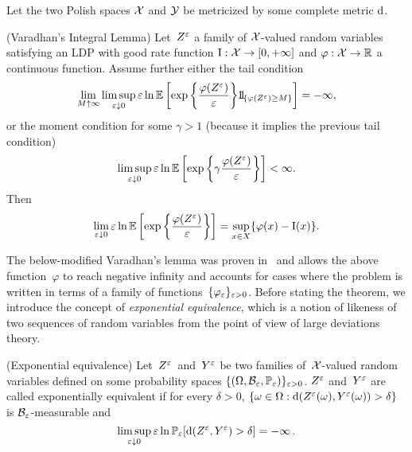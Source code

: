 Let the two Polish spaces $\mathcal{X}$ and $\mathcal{Y}$ be metricized by some complete metric $\mathrm{d}$.
\begin{theorem} (Varadhan's Integral Lemma)\label{thm:varadhan} %
Let~$Z^{\varepsilon}$ a family of $\mathcal{X}$-valued random variables satisfying an LDP with good rate function $\mathrm{I}:\mathcal{X}\to [0,+\infty]$ and $\varphi: \mathcal{X} \to \mathbb{R}$ a continuous function. 
Assume further either the tail condition
$$
\lim\limits_{M\uparrow \infty} \limsup_{\eps \downarrow 0}
\eps\ln \EE\left[\exp\left\{\frac{\varphi(Z^{\eps})}{\eps}\right\}\ind_{ \{ \varphi(Z^{\eps}) \geq M\}}\right]  = - \infty,
$$
or the moment condition for some $\gamma > 1$ (because it implies the previous tail condition)
$$
\limsup\limits_{\varepsilon \downarrow 0}
\varepsilon\ln \mathbb{E}\left[\exp\left\{\gamma \frac{\varphi(Z^{\varepsilon})}{\varepsilon}\right\}\right]
< \infty .
$$
Then
$$
\lim_{\varepsilon \downarrow 0}
\varepsilon\ln \mathbb{E}\left[\exp\left\{\frac{\varphi(Z^{\varepsilon})}{\varepsilon}\right\}\right]
= \sup\limits_{x \in X} \{\varphi(x) - \mathrm{I}(x) \}.
$$
\end{theorem}

The below-modified Varadhan's lemma was proven in~\cite{Robertson2010SampleModels} and allows the above function~$\varphi$ to reach negative infinity and accounts for cases where the problem is written in terms of a family of functions~$\{\varphi_{\varepsilon}\}_{\varepsilon>0}$. Before stating the theorem, we introduce the concept of \emph{exponential equivalence}, which is a notion of likeness of two sequences of random variables from the point of view of large deviations theory.
\begin{definition} (Exponential equivalence)\label{def:exponential_equivalence}  %
Let~$Z^{\varepsilon}$~and~$Y^\varepsilon$ be two families of~$\mathcal{X}$\nobreakdash-valued random variables defined on some probability spaces $\{ (\Omega,\mathcal{B}_{\varepsilon},\mathbb{P}_\varepsilon)\}_{\varepsilon>0}$. $Z^{\varepsilon}$ and~$Y^\varepsilon$ are called exponentially equivalent if for every $\delta > 0$,
$\{\omega\in\Omega: \mathrm{d}(Z^{\varepsilon}(\omega),Y^\varepsilon(\omega)) > \delta\}$ is $\mathcal{B}_\varepsilon$-measurable
and 
$$\limsup\limits_{\varepsilon \downarrow 0} \varepsilon\ln\mathbb{P}_\varepsilon[\mathrm{d}(Z^{\varepsilon},Y^\varepsilon) > \delta] = - \infty\,.$$
\end{definition}

